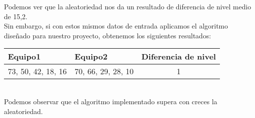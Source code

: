 Podemos ver que la aleatoriedad nos da un resultado de diferencia de nivel medio de 15,2.\\

Sin embargo, si con estos mismos datos de entrada aplicamos el algoritmo diseñado para nuestro proyecto, obtenemos los siguientes resultados:\\

\begin{tabular}{| l | l | c |}
    \hline
    \textbf{Equipo1} & \textbf{Equipo2} & \textbf{Diferencia de nivel}\\
    \hline
    73, 50, 42, 18, 16 & 70, 66, 29, 28, 10 & 1\\
    \hline
\end{tabular}\\

Podemos observar que el algoritmo implementado supera con creces la aleatoriedad.
